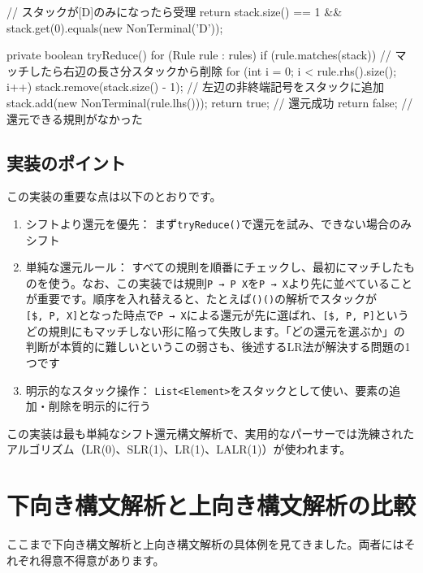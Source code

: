 \begin{codescreen}{}
{{        // スタックが[D]のみになったら受理
        return stack.size() == 1 && 
               stack.get(0).equals(new NonTerminal('D'));
    }

    private boolean tryReduce() {
        for (Rule rule : rules) {
            if (rule.matches(stack)) {
                // マッチしたら右辺の長さ分スタックから削除
                for (int i = 0; i < rule.rhs().size(); i++) {
                    stack.remove(stack.size() - 1);
                }
                // 左辺の非終端記号をスタックに追加
                stack.add(new NonTerminal(rule.lhs()));
                return true; // 還元成功
            }
        }
        return false; // 還元できる規則がなかった
    }
}
\end{codescreen}

\subsection{実装のポイント}

この実装の重要な点は以下のとおりです。

\begin{enumerate}
\item
  シフトより還元を優先：
  まず\texttt{tryReduce()}で還元を試み、できない場合のみシフト
\item
  単純な還元ルール：
  すべての規則を順番にチェックし、最初にマッチしたものを使う。なお、この実装では規則\texttt{P\ →\ P\ X}を\texttt{P\ →\ X}より先に並べていることが重要です。順序を入れ替えると、たとえば\texttt{()()}の解析でスタックが\texttt{{[}\$,\ P,\ X{]}}となった時点で\texttt{P\ →\ X}による還元が先に選ばれ、\texttt{{[}\$,\ P,\ P{]}}というどの規則にもマッチしない形に陥って失敗します。「どの還元を選ぶか」の判断が本質的に難しいというこの弱さも、後述するLR法が解決する問題の1つです
\item
  明示的なスタック操作：
  \texttt{List\textless{}Element\textgreater{}}をスタックとして使い、要素の追加・削除を明示的に行う
\end{enumerate}

この実装は最も単純なシフト還元構文解析で、実用的なパーサーでは洗練されたアルゴリズム（LR(0)、SLR(1)、LR(1)、LALR(1)）が使われます。

\section{下向き構文解析と上向き構文解析の比較}

ここまで下向き構文解析と上向き構文解析の具体例を見てきました。両者にはそれぞれ得意不得意があります。

